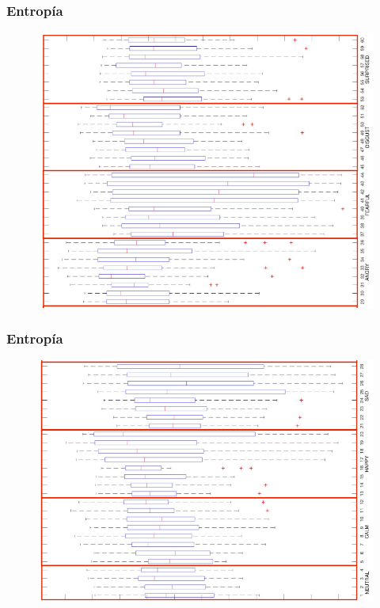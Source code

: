 \documentclass{beamer}
\begin{document}
\begin{frame}
\frametitle{Entropía}
\begin{figure}
\includegraphics[scale=0.5]{emo1}
\end{figure}
\end{frame}

\begin{frame}
\frametitle{Entropía}
\begin{figure}
\includegraphics[scale=0.5]{emo2}
\end{figure}

\end{frame}
\end{document}
